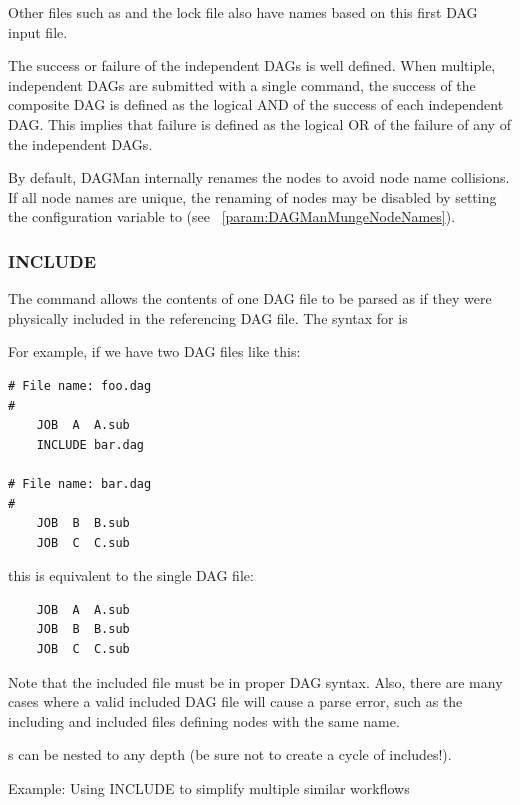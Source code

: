 Other files such
as  and the lock file also have names based on this
first DAG input file.

The success or failure of the independent DAGs is well defined.
When multiple, independent DAGs are submitted with a single
command, the
success of the composite DAG is defined as the logical AND
of the success of each independent DAG.
This implies that failure is defined as the logical OR
of the failure of any of the independent DAGs.

By default, DAGMan internally renames the nodes to avoid node name collisions.  
If all node names are unique, 
the renaming of nodes may be disabled by
setting the configuration variable 
to  (see ~\ref{param:DAGManMungeNodeNames}).

\subsubsection{\label{sec:DAG-include}INCLUDE}

The  command allows the contents of one DAG file to be
parsed as if they were physically included in the referencing DAG
file.  The syntax for  is

 

For example, if we have two DAG files like this:
\begin{verbatim}
# File name: foo.dag
#
    JOB  A  A.sub
    INCLUDE bar.dag

# File name: bar.dag
#
    JOB  B  B.sub
    JOB  C  C.sub
\end{verbatim}

this is equivalent to the single DAG file:
\begin{verbatim}
    JOB  A  A.sub
    JOB  B  B.sub
    JOB  C  C.sub
\end{verbatim}

Note that the included file must be in proper DAG syntax.  Also, there
are many cases where a valid included DAG file will cause a parse error,
such as the including and included files defining nodes with the same
name.

s can be nested to any depth (be sure not to create a cycle
of includes!).

\begin{description}
\item[Example: Using INCLUDE to simplify multiple similar workflows]
\end{description}

